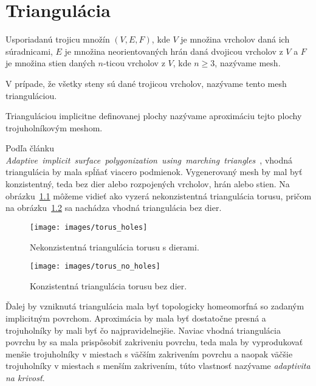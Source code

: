 \chapter{Triangulácia}
\label{kap:triangulation}

Usporiadanú trojicu množín $(V, E, F)$, kde $V$ je množina vrcholov daná ich súradnicami, 
$E$ je množina neorientovaných hrán daná 
dvojicou vrcholov z $V$ a $F$ je množina stien daných $n$-ticou vrcholov z $V$, kde $n \geq 3$, 
nazývame mesh.

V prípade, že všetky steny sú dané trojicou vrcholov, nazývame tento mesh trianguláciou.

Trianguláciou implicitne definovanej plochy nazývame aproximáciu tejto plochy trojuholníkovým meshom.

Podľa článku \mbox{\textit{Adaptive implicit surface polygonization using marching triangles} \cite{akkouche2001adaptive}},
vhodná triangulácia by mala spĺňať viacero podmienok. Vygenerovaný mesh by mal byť konzistentný, 
teda bez dier alebo rozpojených vrcholov, hrán alebo stien. Na \mbox{obrázku \ref{obr:torus_holes}}
môžeme vidieť ako vyzerá nekonzistentná triangulácia torusu, pričom na 
\mbox{obrázku \ref{obr:torus_no_holes}} sa nachádza vhodná triangulácia bez dier. 

\begin{figure}
    \centerline{\texttt{[image: images/torus\_holes]}}
    \caption[Príklad nekonzistentnej triangulácie]{Nekonzistentná triangulácia torusu s dierami.}
    \label{obr:torus_holes}
\end{figure}

\begin{figure}
    \centerline{\texttt{[image: images/torus\_no\_holes]}}
    \caption[Príklad konzistentnej triangulácie]{Konzistentná triangulácia torusu bez dier.}
    \label{obr:torus_no_holes}
\end{figure}

Ďalej by vzniknutá triangulácia mala byť topologicky homeomorfná 
so zadaným implicitným povrchom. Aproximácia by mala byť dostatočne presná a trojuholníky by mali 
byť čo najpravidelnejšie. Naviac vhodná triangulácia povrchu by sa mala prispôsobiť zakriveniu povrchu,
teda mala by vyprodukovať menšie trojuholníky v miestach s väčším zakrivením povrchu a naopak väčšie
trojuholníky v miestach s menším zakrivením, túto vlastnosť nazývame \textit{adaptivita na krivosť}.

